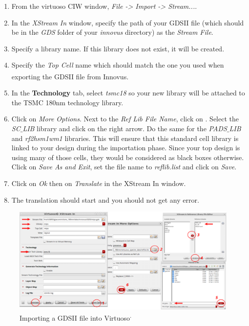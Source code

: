 \begin{enumerate}
	\item From the virtuoso CIW window, \textit{File -> Import -> Stream...}.
	\item In the \textit{XStream In} window, specify the path of your GDSII file (which should be in the \textit{GDS} folder of your \textit{innovus} directory) as the \textit{Stream File}.
	\item Specify a library name. If this library does not exist, it will be created.
	\item Specify the \textit{Top Cell} name which should match the one you used when exporting the GDSII file from Innovus\textsuperscript{\tiny\textregistered}.
	\item In the \textbf{Technology} tab, select \textit{tsmc18} so your new library will be attached to the TSMC 180nm technology library.
	\item Click on \textit{More Options}. Next to the \textit{Ref Lib File Name}, click on . Select the \textit{SC$\_$LIB} library and click on the right arrow. Do the same for the \textit{PADS$\_$LIB} and \textit{rf2hsm1wm1} libraries. This will ensure that this standard cell library is linked to your design during the importation phase. Since your top design is using many of those cells, they would be considered as black boxes otherwise. Click on \textit{Save As and Exit}, set the file name to \textit{reflib.list} and click on \textit{Save}.
	\item Click on \textit{Ok} then on \textit{Translate} in the XStream In window.
	\item The translation should start and you should not get any error.
\end{enumerate}

\begin{figure}[!h]
	\centering
	\includegraphics[scale=0.45]{figures/lab5_backend/import_gds.pdf}
	\caption{Importing a GDSII file into Virtuoso\textsuperscript{\tiny\textregistered.}}
	\label{import_gds}
\end{figure}

